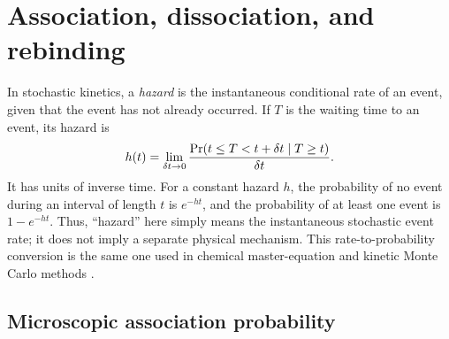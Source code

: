 \section{Association, dissociation, and rebinding}
\label{sec:binding}

In stochastic kinetics, a \emph{hazard} is the instantaneous conditional rate
of an event, given that the event has not already occurred.  If $T$ is the
waiting time to an event, its hazard is
\begin{equation}
 h(t)=\lim_{\delta t\rightarrow0}
 \frac{\mathop{\mathrm{Pr}}\!\left(t\leq T<t+\delta t\mid T\geq t\right)}{\delta t}.
 \label{eq:hazard-definition}
\end{equation}
It has units of inverse time.  For a constant hazard $h$, the probability of
no event during an interval of length $t$ is $e^{-ht}$, and the probability of
at least one event is $1-e^{-ht}$.  Thus, ``hazard'' here simply means the
instantaneous stochastic event rate; it does not imply a separate physical
mechanism.  This rate-to-probability conversion is the same one used in
chemical master-equation and kinetic Monte Carlo methods
\citep{gillespie1976}.

\subsection{Microscopic association probability}

